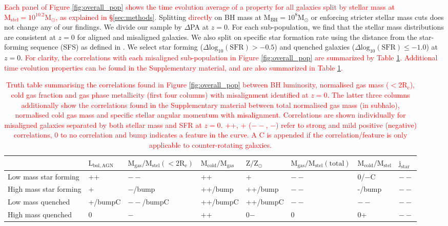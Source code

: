 \documentclass[fleqn,usenatbib]{mnras}
\newcommand{\red}[1]{{\textcolor{red}{#1}}}
\begin{document}
\red{Each panel of Figure \ref{fig:overall_pop} shows the time evolution average of a property for all galaxies split by stellar mass at $\mathrm{M_{stel} = 10^{10.2}M_{\odot}}$, as explained in \S\ref{sec:methods}.} Splitting \red{directly} on BH mass at $\mathrm{M_{BH} = 10^{8}M_{\odot}}$ or enforcing stricter stellar mass cuts does not change any of our findings. We divide our sample by $\Delta$PA at $z=0$. For each sub-population, we find that the stellar mass distributions are consistent at $z=0$ for aligned and misaligned galaxies. We also split on specific star formation rate using the distance from the star-forming sequence (SFS) as defined in \citet{pillepich2019}. We select star forming ($\Delta \mathrm{log_{10}(SFR) > -0.5}$) and quenched galaxies ($\Delta \mathrm{log_{10}(SFR) \leq -1.0}$) at $z=0$. \red{For clarity, the correlations with each misaligned sub-population in Figure \ref{fig:overall_pop} are summarized by Table \ref{tab:truth}. Additional time evolution properties can be found in the Supplementary material, and are also summarized in Table \ref{tab:truth}.}

\begin{table}
\begin{tabular}{llllllll}
\hline
&  $\mathrm{L_{bol,AGN}}$ & $\mathrm{M_{gas} / M_{stel} (< 2R_e)}$ & $\mathrm{M_{cold} / M_{gas}}$ & $\mathrm{Z / Z_{\odot}}$ & $\mathrm{M_{gas}/M_{stel} (total)}$ & $\mathrm{M_{cold}/M_{stel}}$ & $\mathrm{j_{star}}$ \\
\hline
Low mass star forming & ++ & $--$ & ++ & + & $--$ & 0/$-$C & $--$ \\
High mass star forming & + & $-$/bump & ++/bump & ++/bump & $--$ & -/bump & $--$ \\
Low mass quenched & +/bumpC & $--$/bumpC & ++/bumpC & ++/bumpC & $--$ & $--$ & $--$ \\
High mass quenched & 0 & $-$ & ++ & 0$-$ & 0 & 0+ & $--$ \\
\end{tabular}
\caption{\red{Truth table summarising the correlations found in Figure \ref{fig:overall_pop} between BH luminosity, normalised gas mass ($\mathrm{< 2R_e}$), cold gas fraction and gas phase metallicity (first four columns) with misalignment identified at $z=0$. The latter three columns additionally show the correlations found in the Supplementary material between total normalised gas mass (in subhalo), normalised cold gas mass and specific stellar angular momentum with misalignment. Correlations are shown individually for misaligned galaxies separated by both stellar mass and SFR at $z=0$. ++, + ($--$, $-$) refer to strong and mild positive (negative) correlations, 0 to no correlation and bump indicates a feature in the curve. A C is appended if the correlation/feature is only applicable to counter-rotating galaxies.}}
\label{tab:truth}
\end{table}
\end{document}
